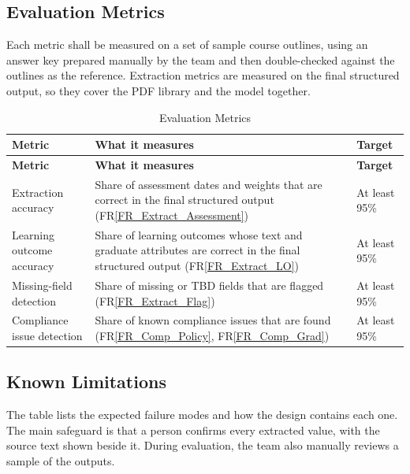 \documentclass[12pt]{article}
\newcommand{\rref}[1]{FR\ref{#1}}
\begin{document}
\subsection{Evaluation Metrics}

\noindent Each metric shall be measured on a set of sample course outlines, using an answer key prepared manually by the team and then double-checked against the outlines as the reference. Extraction metrics are measured on the final structured output, so they cover the PDF library and the model together.

{\small
\renewcommand{\arraystretch}{1.2}
\begin{longtable}{>{\raggedright\arraybackslash}p{} >{\raggedright\arraybackslash}p{} >{\raggedright\arraybackslash}p{}}
\toprule
\textbf{Metric} & \textbf{What it measures} & \textbf{Target} \\
\midrule
\endfirsthead
\toprule
\textbf{Metric} & \textbf{What it measures} & \textbf{Target} \\
\midrule
\endhead
\endfoot
\bottomrule
\caption{Evaluation Metrics} \label{tab:ai-metrics}
\endlastfoot
Extraction accuracy & Share of assessment dates and weights that are correct in the final structured output (\rref{FR_Extract_Assessment}) & At least 95\% \\ \addlinespace
Learning outcome accuracy & Share of learning outcomes whose text and graduate attributes are correct in the final structured output (\rref{FR_Extract_LO}) & At least 95\% \\ \addlinespace
Missing-field detection & Share of missing or TBD fields that are flagged (\rref{FR_Extract_Flag}) & At least 95\% \\ \addlinespace
Compliance issue detection & Share of known compliance issues that are found (\rref{FR_Comp_Policy}, \rref{FR_Comp_Grad}) & At least 95\% \\
\end{longtable}
}

\subsection{Known Limitations}

\noindent The table lists the expected failure modes and how the design contains each one. The main safeguard is that a person confirms every extracted value, with the source text shown beside it. During evaluation, the team also manually reviews a sample of the outputs.
\end{document}
